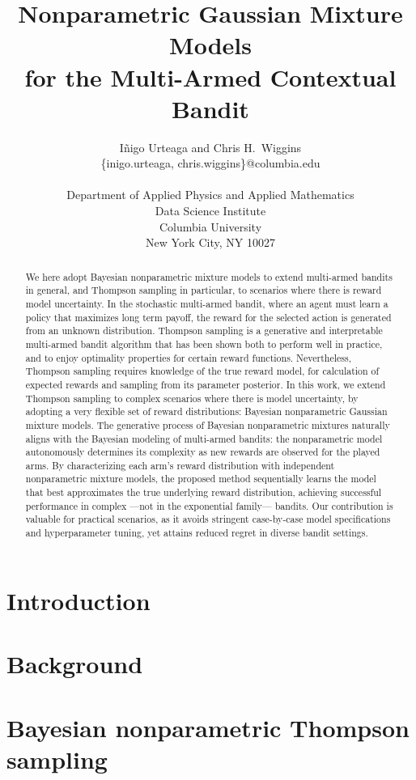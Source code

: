 \documentclass{article}
\title{Nonparametric Gaussian Mixture Models \\ for the Multi-Armed Contextual Bandit}
\author{ I\~{n}igo Urteaga and Chris H.~Wiggins\\
	{\sf \{inigo.urteaga, chris.wiggins\}@columbia.edu} \\\\
	Department of	Applied Physics and Applied Mathematics\\
	Data Science Institute\\
	Columbia University\\
	New York City, NY 10027
}
\begin{document}
	
\maketitle

\begin{abstract}
We here adopt Bayesian nonparametric mixture models to extend multi-armed bandits in general, and Thompson sampling in particular, to scenarios where there is reward model uncertainty. In the stochastic multi-armed bandit, where an agent must learn a policy that maximizes long term payoff, the reward for the selected action is generated from an unknown distribution. Thompson sampling is a generative and interpretable multi-armed bandit algorithm that has been shown both to perform well in practice, and to enjoy optimality properties for certain reward functions. Nevertheless, Thompson sampling requires knowledge of the true reward model, for calculation of expected rewards and sampling from its parameter posterior. In this work, we extend Thompson sampling to complex scenarios where there is model uncertainty, by adopting a very flexible set of reward distributions: Bayesian nonparametric Gaussian mixture models. The generative process of Bayesian nonparametric mixtures naturally aligns with the Bayesian modeling of multi-armed bandits: the nonparametric model autonomously determines its complexity as new rewards are observed for the played arms. By characterizing each arm's reward distribution with independent nonparametric mixture models, the proposed method sequentially learns the model that best approximates the true underlying reward distribution, achieving successful performance in complex ---not in the exponential family--- bandits. Our contribution is valuable for practical scenarios, as it avoids stringent case-by-case model specifications and hyperparameter tuning, yet attains reduced regret in diverse bandit settings.
\end{abstract}

\section{Introduction}
\label{sec:intro}


\section{Background}
\label{sec:background}


\section{Bayesian nonparametric Thompson sampling}
\label{sec:proposed_method}

\end{document}
